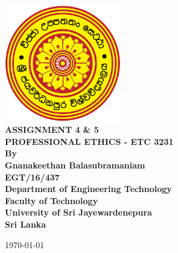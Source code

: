 \documentclass[12pt,a4paper,oneside]{article}
\begin{document}
\begin{titlepage}

\begin{flushright}
\end{flushright}


\center %
{
\includegraphics[width=2in,keepaspectratio]{logo.png}\\[0.5cm]
    \fontsize{24pt}{30}\selectfont \textbf{\uppercase{Assignment 4 \& 5}}\\[1.5cm]
\fontsize{16}{24}\selectfont \textbf{\uppercase{Professional Ethics - ETC 3231}}\\[1.5cm]
\fontsize{16pt}{24}\selectfont \textbf{By}\\[0.5cm]
\fontsize{12pt}{12}\selectfont {
}
\vspace*{\fill}
\fontsize{12pt}{12}\selectfont \textbf { Gnanakeethan Balasubramaniam \\ EGT/16/437}\\[0.5cm]


\vspace*{\fill}
\fontsize{12pt}{12}\selectfont \textbf {Department of Engineering Technology \\ Faculty of Technology\\University of Sri Jayewardenepura\\ Sri Lanka \\ }
\vspace*{\fill}

\today
}


\end{titlepage}
\end{document}
